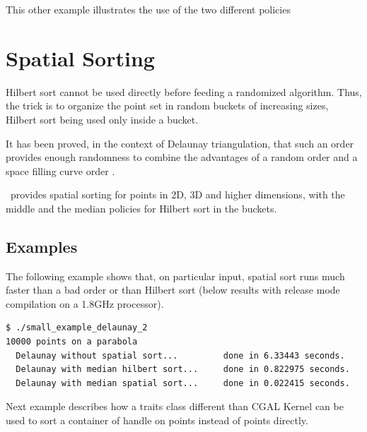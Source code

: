 This other example illustrates the use of the two different policies




\section{Spatial Sorting\label{sec:spatial_sorting}}

Hilbert sort cannot be used directly before feeding a randomized algorithm.
Thus, the trick is to organize the point set in random buckets of increasing
sizes, Hilbert sort being used only inside a bucket.

It has been proved, in the context of Delaunay triangulation, that
such an order provides enough randomness to combine the advantages of a random
 order and a space filling curve order \cite{acr-icb-03}.


\cgal\ provides spatial sorting for points in 2D, 3D and higher dimensions,
with the middle and the median policies for Hilbert sort in the buckets.

\subsection{Examples}

The following example shows that, on particular input, spatial sort
runs much faster than a bad order or than Hilbert sort (below results
with release mode compilation on a 1.8GHz processor).
\begin{verbatim}
$ ./small_example_delaunay_2 
10000 points on a parabola
  Delaunay without spatial sort...         done in 6.33443 seconds.
  Delaunay with median hilbert sort...     done in 0.822975 seconds.
  Delaunay with median spatial sort...     done in 0.022415 seconds.
\end{verbatim}


Next example describes how a traits class different than CGAL Kernel can be
used to sort a container of handle on points instead of points directly.


